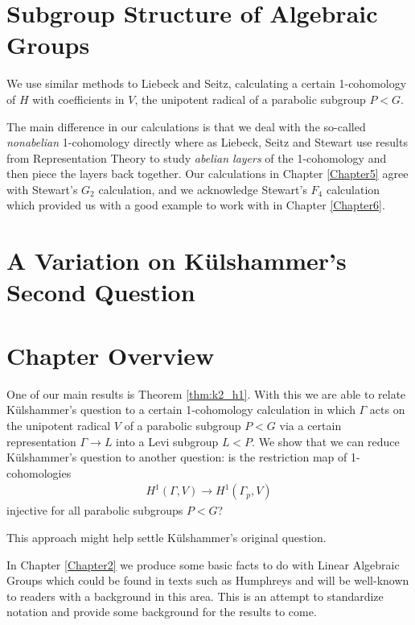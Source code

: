 \section{Subgroup Structure of Algebraic Groups}

We use similar methods to Liebeck and Seitz, calculating a certain 1-cohomology of $H$ with coefficients in $V$, the unipotent radical of a parabolic subgroup $P < G$.

The main difference in our calculations is that we deal with the so-called \emph{nonabelian} 1-cohomology directly where as Liebeck, Seitz and Stewart use results from Representation Theory to study \emph{abelian layers} of the 1-cohomology and then piece the layers back together. Our calculations in Chapter \ref{Chapter5} agree with Stewart's $G_2$ calculation, and we acknowledge Stewart's $F_4$ calculation which provided us with a good example to work with in Chapter \ref{Chapter6}.

\section{A Variation on K\"ulshammer's Second Question}

\section{Chapter Overview}

One of our main results is Theorem \ref{thm:k2_h1}. With this we are able to relate K\"ulshammer's question to a certain 1-cohomology calculation in which $\Gamma$ acts on the unipotent radical $V$ of a parabolic subgroup $P < G$ via a certain representation $\Gamma \rightarrow L$ into a Levi subgroup $L < P$. We show that we can reduce K\"ulshammer's question to another question: is the restriction map of 1-cohomologies
\begin{align}
  H^1(\Gamma, V) \rightarrow H^1(\Gamma_p, V)
\end{align}
injective for all parabolic subgroups $P<G$?

This approach might help settle K\"ulshammer's original question.

In Chapter \ref{Chapter2} we produce some basic facts to do with Linear Algebraic Groups which could be found in texts such as Humphreys \cite{humphreys1975linear} and will be well-known to readers with a background in this area. This is an attempt to standardize notation and provide some background for the results to come.

